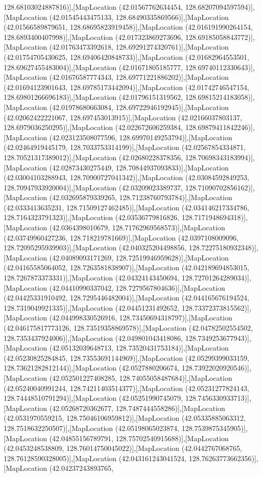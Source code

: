 128.68103024887816)],[MapLocation (42.01567762634454, 128.68207094597594)],[MapLocation (42.01545443475133, 128.68490335869566)],[MapLocation (42.01566589879651, 128.68695823919458)],[MapLocation (42.016191990264154, 128.6893400407998)],[MapLocation (42.017323869273696, 128.69185058843772)],[MapLocation (42.01763473392618, 128.69291274320761)],[MapLocation (42.01754705430625, 128.69406420848733)],[MapLocation (42.01682964553501, 128.69627455483004)],[MapLocation (42.01671805185777, 128.69740112330643)],[MapLocation (42.01676587774343, 128.69771221886202)],[MapLocation (42.01694123901643, 128.69785173442094)],[MapLocation (42.01742746547154, 128.69801266696183)],[MapLocation (42.01796151319562, 128.69815214183058)],[MapLocation (42.01978680663084, 128.69722946192945)],[MapLocation (42.02062422221067, 128.697453013915)],[MapLocation (42.02166037803137, 128.6979036250295)],[MapLocation (42.022672606259384, 128.69879411842246)],[MapLocation (42.023123508077596, 128.69970149253794)],[MapLocation (42.02464919445179, 128.7033753314199)],[MapLocation (42.02567854334871, 128.70521317389012)],[MapLocation (42.02680228378356, 128.70698343183994)],[MapLocation (42.02873430275449, 128.70844937093833)],[MapLocation (42.03004103288943, 128.70900727041342)],[MapLocation (42.03084592849253, 128.70947933920004)],[MapLocation (42.03209023389737, 128.71090702856162)],[MapLocation (42.032695879339265, 128.71238760793784)],[MapLocation (42.0333413635231, 128.71509127462485)],[MapLocation (42.034146217334786, 128.7164323791323)],[MapLocation (42.03536779816826, 128.7171948694318)],[MapLocation (42.0364398010679, 128.71762969568573)],[MapLocation (42.03749960427236, 128.718219781669)],[MapLocation (42.0397108009096, 128.72095295939903)],[MapLocation (42.040325204498856, 128.72275180932348)],[MapLocation (42.04089093171269, 128.72519946959628)],[MapLocation (42.04165585064052, 128.7263581838907)],[MapLocation (42.042189694853015, 128.7267873373331)],[MapLocation (42.04324143450694, 128.72701264289034)],[MapLocation (42.04410990337042, 128.7279567804636)],[MapLocation (42.04425331910492, 128.7295446482004)],[MapLocation (42.044165676194524, 128.7319049921335)],[MapLocation (42.04451231492652, 128.73372373815562)],[MapLocation (42.044998330526916, 128.73450694318797)],[MapLocation (42.046175817773126, 128.73519358869578)],[MapLocation (42.04782502554502, 128.7353437924006)],[MapLocation (42.049801043418086, 128.7349253677943)],[MapLocation (42.05132039648713, 128.73520431753184)],[MapLocation (42.05230825284845, 128.73553691144969)],[MapLocation (42.05299399033159, 128.73621282812144)],[MapLocation (42.0527880206674, 128.73922020920546)],[MapLocation (42.052501227408285, 128.74055058487684)],[MapLocation (42.05240040991244, 128.74211403514377)],[MapLocation (42.05231277824143, 128.74448510791294)],[MapLocation (42.05251990745079, 128.7456330933713)],[MapLocation (42.05268720362677, 128.7487444558286)],[MapLocation (42.0531970559215, 128.75046106959812)],[MapLocation (42.05335885063312, 128.7518632250507)],[MapLocation (42.05198065023874, 128.7539875345905)],[MapLocation (42.04855156789791, 128.75702540915688)],[MapLocation (42.0453248538809, 128.76014750045022)],[MapLocation (42.0442767068765, 128.76128590328005)],[MapLocation (42.043161243041524, 128.76263773662356)],[MapLocation (42.04237243893765, 